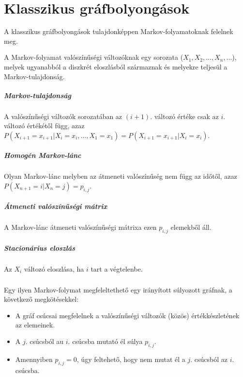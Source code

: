 \chapter{Klasszikus gráfbolyongások}

A klasszikus gráfbolyongások tulajdonképpen Markov-folyamatoknak felelnek meg.

A Markov-folyamat valószínűségi változóknak egy sorozata ($X_1, X_2, ..., X_n,
  ...$), melyek ugyanabból a diszkrét eloszlásból származnak és melyekre teljesül
a Markov-tulajdonság.

\paragraph{Markov-tulajdonság} A valószínűségi változók sorozatában az $(i+1).$
változó értéke csak az $i.$ változó értékétől függ, azaz $P(X_{i+1} = x_{i+1} |
  X_i = x_i, ..., X_1 = x_1) = P(X_{i+1} = x_{i+1} | X_i = x_i)$.

\paragraph{Homogén Markov-lánc} Olyan Markov-lánc melyben az átmeneti
valószínűség nem függ az időtől, azaz $P(X_{n+1} = i | X_n = j) = p_{i,j}$.

\paragraph{Átmeneti valószínűségi mátrix} A Markov-lánc átmeneti valószínűségi
mátrixa ezen $p_{i,j}$ elemekből áll.

\paragraph{Stacionárius eloszlás} Az $X_i$ változó eloszlása, ha $i$ tart a
végtelenbe.

\paragraph{}

Egy ilyen Markov-folymat megfeleltethető egy irányított súlyozott gráfnak,
a következő megkötésekkel:

\begin{itemize}
  \item A gráf csúcsai megfelelnek a valószínűségi változók (közös)
        értékkészletének az elemeinek.
  \item A $j.$ csúcsból au $i.$ csúcsba mutató él súlya $p_{i,j}$.
  \item Amennyiben $p_{i,j}=0$, úgy feltehető, hogy nem mutat él a $j.$
        csúcsból az $i.$ csúcsba.
\end{itemize}

